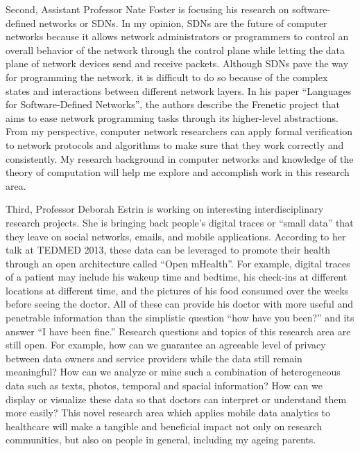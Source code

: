 \documentclass[a4paper,10pt]{report}
\begin{document}
\vspace{0.2cm}
Second, Assistant Professor Nate Foster is focusing his research on software-defined networks or SDNs. In my opinion, SDNs are the future of computer networks because it allows network administrators or programmers to control an overall behavior of the network through the control plane while letting the data plane of network devices send and receive packets. Although SDNs pave the way for programming the network, it is difficult to do so because of the complex states and interactions between different network layers. In his paper ``Languages for Software-Defined Networks'', the authors describe the Frenetic project that aims to ease network programming tasks through its higher-level abstractions. From my perspective, computer network researchers can apply formal verification to network protocols and algorithms to make sure that they work correctly and consistently. My research background in computer networks and knowledge of the theory of computation will help me explore and accomplish work in this research area.

\vspace{0.2cm}
Third, Professor Deborah Estrin is working on interesting interdisciplinary research projects. She is bringing back people's digital traces or ``small data'' that they leave on social networks, emails, and mobile applications. According to her talk at TEDMED 2013, these data can be leveraged to promote their health through an open architecture called ``Open mHealth''. For example, digital traces of a patient may include his wakeup time and bedtime, his check-ins at different locations at different time, and the pictures of his food consumed over the weeks before seeing the doctor. All of these can provide his doctor with more useful and penetrable information than the simplistic question ``how have you been?'' and its answer ``I have been fine.'' Research questions and topics of this research area are still open. For example, how can we guarantee an agreeable level of privacy between data owners and service providers while the data still remain meaningful? How can we analyze or mine such a combination of heterogeneous data such as texts, photos, temporal and spacial information? How can we display or visualize these data so that doctors can interpret or understand them more easily? This novel research area which applies mobile data analytics to healthcare will make a tangible and beneficial impact not only on research communities, but also on people in general, including my ageing parents.
\end{document}
